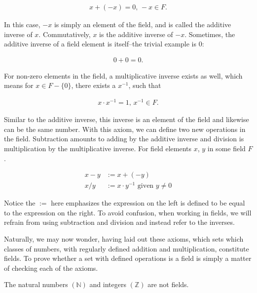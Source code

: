 \documentclass{report}
\begin{document}
\begin{align*}
	x + (-x) = 0, \, -x \in F.
\end{align*}

In this case, $-x$ is simply an element of the field, and is called the additive inverse of $x$. Commutatively, $x$ is the additive inverse of $-x$. Sometimes, the additive inverse of a field element is itself--the trivial example is 0:

\begin{align*}
	0 + 0 = 0.
\end{align*}

For non-zero elements in the field, a multiplicative inverse exists as well, which means for $x \in F - \{ 0 \}$, there exists a $x^{-1}$, such that

\begin{align*}
	x \cdot x^{-1} = 1,\, x^{-1} \in F.
\end{align*}

Similar to the additive inverse, this inverse is an element of the field and likewise can be the same number. With this axiom, we can define two new operations in the field. Subtraction amounts to adding by the additive inverse and division is multiplication by the multiplicative inverse. For field elements $x$, $y$ in some field $F$.

\begin{align}
	x - y &:= x + (-y) \\
	x / y &:= x \cdot y^{-1} \text{ given } y \neq 0
\end{align}

Notice the $:=$ here emphasizes the expression on the left is defined to be equal to the expression on the right. To avoid confusion, when working in fields, we will refrain from using subtraction and division and instead refer to the inverses.

Naturally, we may now wonder, having laid out these axioms, which sets which classes of numbers, with regularly defined addition and multiplication, constitute fields. To prove whether a set with defined operations is a field is simply a matter of checking each of the axioms. \\

\vspace{\baselineskip}
\begin{theorem}
	The natural numbers $(\mathbb{N})$ and integers $(\mathbb{Z})$ are not fields. 
\end{theorem}
\end{document}
